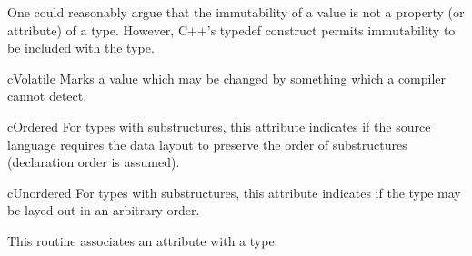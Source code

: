 \begin{Description}
One could reasonably argue that the immutability of a value is not a
property (or attribute) of a type.  However, C++'s typedef construct
permits immutability to be included with the type.
\item [cVolatile] Marks a value which may be changed by something which
a compiler cannot detect.
\item [cOrdered] For types with substructures, this attribute indicates
if the source language requires the data layout to preserve the order
of substructures (declaration order is assumed).  
\item [cUnordered] For types with substructures, this attribute indicates
if the type may be layed out in an arbitrary order.
\end{Description}

\begin{functionality}
This routine associates an attribute with a type.
\end{functionality}

